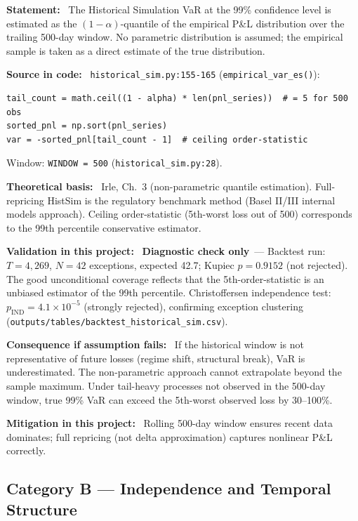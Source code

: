 \documentclass[11pt,a4paper]{article}
\newcommand{\asmfield}[1]{\medskip\noindent\textbf{#1:}\ }
\newcommand{\code}[1]{\texttt{#1}}
\newcommand{\diagnostic}{\textbf{Diagnostic check only}}
\begin{document}
\asmfield{Statement}
The Historical Simulation VaR at the 99\% confidence level is estimated
as the $(1 - \alpha)$-quantile of the empirical P\&L distribution over
the trailing 500-day window. No parametric distribution is assumed;
the empirical sample is taken as a direct estimate of the true distribution.

\asmfield{Source in code}
\code{historical\_sim.py:155-165} (\code{empirical\_var\_es()}):
\begin{lstlisting}
tail_count = math.ceil((1 - alpha) * len(pnl_series))  # = 5 for 500 obs
sorted_pnl = np.sort(pnl_series)
var = -sorted_pnl[tail_count - 1]  # ceiling order-statistic
\end{lstlisting}
Window: \code{WINDOW = 500} (\code{historical\_sim.py:28}).

\asmfield{Theoretical basis}
Irle, Ch.~3 (non-parametric quantile estimation). Full-repricing HistSim
is the regulatory benchmark method (Basel II/III internal models approach).
Ceiling order-statistic (5th-worst loss out of 500) corresponds to the
99th percentile conservative estimator.

\asmfield{Validation in this project}
\diagnostic\ --- Backtest run: $T = 4{,}269$, $N = 42$ exceptions,
expected 42.7; Kupiec $p = 0.9152$ (not rejected). The good unconditional
coverage reflects that the 5th-order-statistic is an unbiased estimator
of the 99th percentile. Christoffersen independence test:
$p_\mathrm{IND} = 4.1 \times 10^{-5}$ (strongly rejected), confirming
exception clustering (\code{outputs/tables/backtest\_historical\_sim.csv}).

\asmfield{Consequence if assumption fails}
If the historical window is not representative of future losses
(regime shift, structural break), VaR is underestimated. The
non-parametric approach cannot extrapolate beyond the sample maximum.
Under tail-heavy processes not observed in the 500-day window, true
99\% VaR can exceed the 5th-worst observed loss by 30--100\%.

\asmfield{Mitigation in this project}
Rolling 500-day window ensures recent data dominates; full repricing
(not delta approximation) captures nonlinear P\&L correctly.

\subsection{Category B --- Independence and Temporal Structure}\label{sec:catB}
\end{document}
